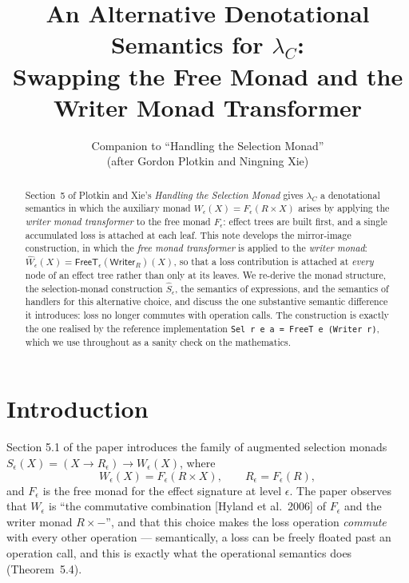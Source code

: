 \documentclass[11pt]{article}
\title{An Alternative Denotational Semantics for $\lambda_C$:\\
Swapping the Free Monad and the Writer Monad Transformer}
\author{Companion to ``Handling the Selection Monad''\\[2pt]
\small (after Gordon Plotkin and Ningning Xie)}
\date{}
\theoremstyle{plain}
\newcommand{\eps}{\epsilon}
\begin{document}
\maketitle

\begin{abstract}
Section~5 of Plotkin and Xie's \emph{Handling the Selection Monad} gives $\lambda_C$ a
denotational semantics in which the auxiliary monad $W_\eps(X) = F_\eps(R\times X)$ arises
by applying the \emph{writer monad transformer} to the free monad $F_\eps$: effect trees are
built first, and a single accumulated loss is attached at each leaf. This note develops the
mirror-image construction, in which the \emph{free monad transformer} is applied to the
\emph{writer monad}: $\widehat W_\eps(X) = \mathsf{FreeT}_\eps(\mathsf{Writer}_R)(X)$, so
that a loss contribution is attached at \emph{every} node of an effect tree rather than only
at its leaves. We re-derive the monad structure, the selection-monad construction
$\widehat S_\eps$, the semantics of expressions, and the semantics of handlers for this
alternative choice, and discuss the one substantive semantic difference it introduces: loss
no longer commutes with operation calls. The construction is exactly the one realised by the
reference implementation \texttt{Sel r e a = FreeT e (Writer r)}, which we use throughout as
a sanity check on the mathematics.
\end{abstract}

\section{Introduction}

Section 5.1 of the paper introduces the family of augmented selection monads
$S_\eps(X) = (X\to R_\eps)\to W_\eps(X)$, where
\[
  W_\eps(X) = F_\eps(R\times X), \qquad R_\eps = F_\eps(R),
\]
and $F_\eps$ is the free monad for the effect signature at level $\eps$. The paper observes
that $W_\eps$ is ``the commutative combination [Hyland et al.\ 2006] of $F_\eps$ and the
writer monad $R\times -$'', and that this choice makes the loss operation \emph{commute}
with every other operation --- semantically, a loss can be freely floated past an operation
call, and this is exactly what the operational semantics does (Theorem~5.4).
\end{document}
